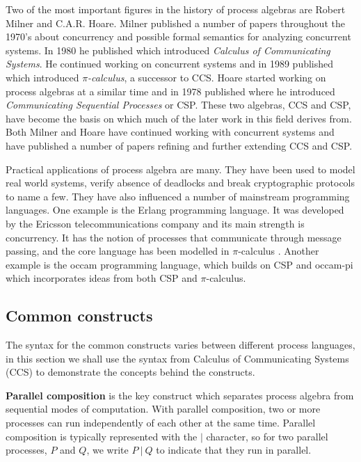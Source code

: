 	Two of the most important figures in the history of process algebras are 
	Robert Milner and C.A.R. Hoare. Milner published a number of papers 
	\cite{milner1,milner2,milner3} throughout the 1970's about concurrency and 
	possible formal semantics for 
	analyzing concurrent systems. In 1980 he published \cite{Milner80} which 
	introduced \textit{Calculus of Communicating Systems}. He continued working 
	on concurrent systems and in 1989 published \cite{Milner89acalculus} which 
	introduced $\pi$\textit{-calculus}, a successor to CCS. Hoare started 
	working on process algebras at a similar time and in 1978 published 
	\cite{csp} where he introduced \textit{Communicating Sequential Processes} 
	or CSP. These two algebras, CCS and CSP, have become the basis on which much 
	of the later work in this field derives from. Both Milner and Hoare have 
	continued working with concurrent systems and have published a number of 
	papers refining and further extending CCS and CSP.
	
	Practical applications of process algebra are many. They have been used to 
	model real world systems, verify absence of deadlocks and break 
	cryptographic protocols to name a few. They have also influenced a number of 
	mainstream programming languages. One example is the Erlang programming 
	language. It was developed by the Ericsson telecommunications company and 
	its main strength is concurrency. It has the notion of processes that 
	communicate through message passing, and the core language has been modelled 
	in $\pi$-calculus \cite{erlang}. Another example is the occam programming 
	language, which builds on CSP and occam-pi \cite{occampi} which incorporates 
	ideas from both CSP and $\pi$-calculus.
		
	
\subsection{Common constructs}\label{common_constructs}
	
	The syntax for the common constructs varies between different process 
	languages, in this section we shall use the syntax from Calculus of 
	Communicating Systems (CCS) to demonstrate the concepts behind the 
	constructs.
	
	\textbf{Parallel composition} is the key construct which separates process 
	algebra from sequential modes of computation. With parallel composition, two 
	or more processes can run independently of each other at the same time. 
	Parallel composition is typically represented with the $|$ character, so for 
	two parallel processes, $P$ and $Q$, we write $P\ |\ Q$ to indicate that 
	they run in parallel.

